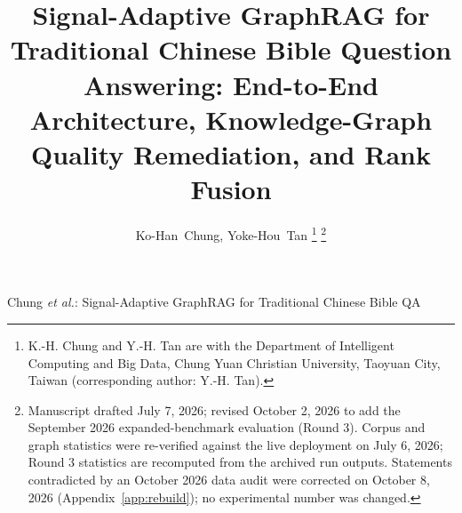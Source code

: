 \documentclass[journal]{IEEEtran}
\begin{document}
\title{Signal-Adaptive GraphRAG for Traditional Chinese Bible Question
Answering: End-to-End Architecture, Knowledge-Graph Quality Remediation,
and Rank Fusion}

\author{Ko-Han~Chung, Yoke-Hou~Tan%
\thanks{K.-H. Chung and Y.-H. Tan are with the Department of Intelligent
Computing and Big Data, Chung Yuan Christian University, Taoyuan City,
Taiwan (corresponding author: Y.-H. Tan).}%
\thanks{Manuscript drafted July 7, 2026; revised October 2, 2026 to add
the September 2026 expanded-benchmark evaluation (Round 3). Corpus and
graph statistics were re-verified against the live deployment on July 6,
2026; Round 3 statistics are recomputed from the archived run outputs.
Statements contradicted by an October 2026 data audit were corrected on
October 8, 2026 (Appendix~\ref{app:rebuild}); no experimental number was
changed.}}

%
{Chung \MakeLowercase{\textit{et al.}}: Signal-Adaptive GraphRAG for Traditional Chinese Bible QA}

\maketitle
\end{document}
